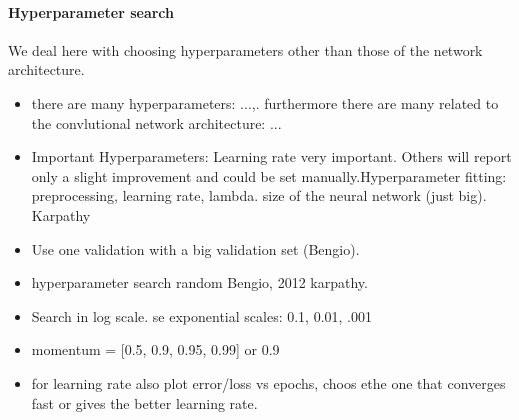 \paragraph{Hyperparameter search}
We deal here with choosing hyperparameters other than those of the network architecture.
\begin{itemize}
\item there are many hyperparameters: ...,. furthermore there are many related to the convlutional network architecture: ...

\item Important Hyperparameters: Learning rate very important. Others will report only a slight improvement and could be set manually.Hyperparameter fitting: preprocessing, learning rate, lambda. size of the neural network (just big). Karpathy

\item Use one validation with a big validation set (Bengio).

\item hyperparameter search random Bengio, 2012 karpathy.

\item Search in log scale. se exponential scales: 0.1, 0.01, .001

\item momentum = [0.5, 0.9, 0.95, 0.99] or 0.9

\item for learning rate also plot error/loss vs epochs, choos ethe one that converges fast or gives the better learning rate.
\end{itemize}


